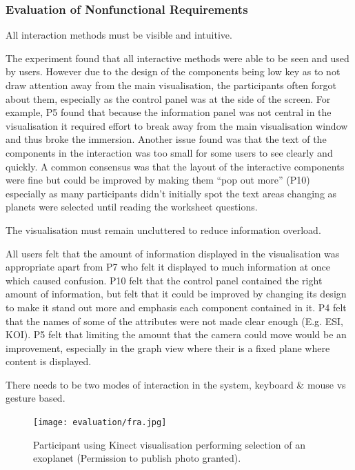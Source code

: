 \subsubsection{Evaluation of Nonfunctional Requirements}
\begin{enumerate}
 {\bf\item[R6.] All interaction methods must be visible and intuitive.}
 
The experiment found that all interactive methods were able to be seen and used
by users. However due to the design of the components being low key as to not
draw attention away from the main visualisation, the participants often forgot
about them, especially as the control panel was at the side of the screen.
For example, P5 found that because the information panel was not central in the
visualisation
it required effort to break away from the main visualisation window and thus
broke
the immersion. Another issue found was that the text of the components in the
interaction was too small for some users to see clearly and quickly.
A common consensus was that the layout of the interactive components were fine
but could be improved by making them ``pop out more'' (P10) especially as many
participants didn't initially spot the text areas changing as planets were
selected
until reading the worksheet questions.
 
{\bf \item[R7.] The visualisation must remain uncluttered to reduce information
overload.}

All users felt that the amount of information displayed in the
visualisation was appropriate apart from P7 who felt
it displayed to much information at once which caused confusion. P10 felt that
the control panel contained the right amount of information, but felt that
it could be improved by changing its design to make it stand out more and
emphasis each component contained in it. P4 felt that the names of some of the
attributes were not made clear enough (E.g. ESI, KOI). P5 felt that limiting the
amount that the camera could move would be an improvement,
especially in the graph view where their is a fixed plane where content is
displayed.

{\bf \item[R8.]  There needs to be two modes of interaction in the system,
keyboard \& mouse vs gesture based.}

\begin{figure}[H]
  \centering
      \texttt{[image: evaluation/fra.jpg]}
  \caption[Participant using Kinect visualisation]{Participant using Kinect
visualisation performing selection of an exoplanet (Permission to publish photo granted).}
  \label{fig:fra}
\end{figure}


\end{enumerate}
